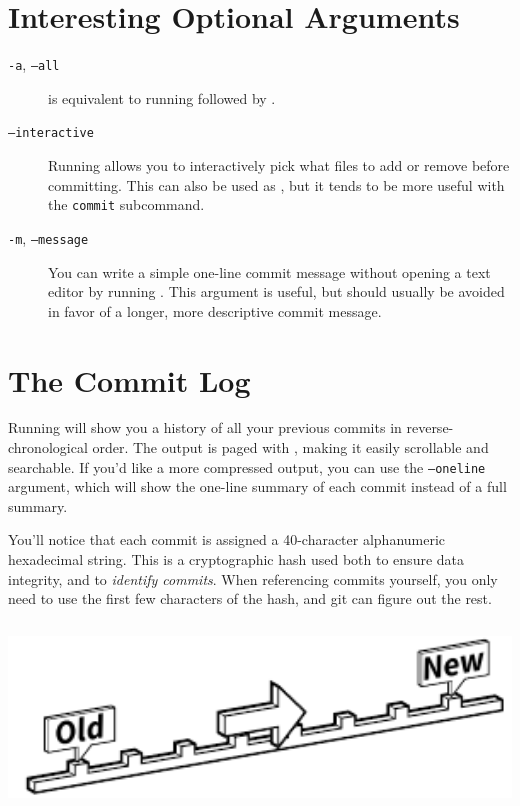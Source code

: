 \documentclass[11pt,letterpaper,twoside]{report}
\begin{document}
\section{Interesting Optional Arguments}

\begin{description}
\item[\texttt{-a}, \texttt{--all}]
     is equivalent to running  followed
    by .
\item[\texttt{--interactive}]
    Running  allows you to interactively pick
    what files to add or remove before committing. This can also be used as
    , but it tends to be more useful with the
    \texttt{commit} subcommand.
\item[\texttt{-m}, \texttt{--message}]
    You can write a simple one-line commit message without opening a text editor
    by running . This
    argument is useful, but should usually be avoided in favor of a longer, more
    descriptive commit message.
\end{description}

\section{The Commit Log}

Running  will show you a history of all your previous commits in
reverse-chronological order. The output is paged with , making it
easily scrollable and searchable. If you'd like a more compressed output, you
can use the \texttt{--oneline} argument, which will show the one-line summary of
each commit instead of a full summary.

You'll notice that each commit is assigned a 40-character alphanumeric
hexadecimal string. This is a cryptographic hash used both to ensure data
integrity, and to \emph{identify commits}. When referencing commits yourself,
you only need to use the first few characters of the hash, and git can figure
out the rest.

\vspace{\fill}
\begin{center}
\includegraphics[height=5cm]{resources/timeline_abstract.pdf}
\end{center}
\vspace*{\fill}
\end{document}
